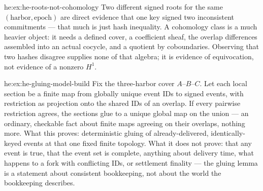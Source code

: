 \begin{pdSolution}{he:ex:he-roots-not-cohomology}
Two different signed roots for the same $(\text{harbor},\text{epoch})$ are
direct evidence that one key signed two inconsistent commitments --- that much
is just hash inequality. A cohomology class is a much heavier object: it needs a
defined cover, a coefficient sheaf, the overlap differences assembled into an
actual cocycle, and a quotient by coboundaries. Observing that two hashes
disagree supplies none of that algebra; it is evidence of equivocation, not
evidence of a nonzero $H^1$.
\end{pdSolution}
\begin{pdSolution}{he:ex:he-gluing-model-build}
Fix the three-harbor cover $A$--$B$--$C$. Let each local section be a
finite map from globally unique event IDs to signed events, with restriction as
projection onto the shared IDs of an overlap. If every pairwise restriction
agrees, the sections glue to a unique global map on the union --- an ordinary,
checkable fact about finite maps agreeing on their overlaps, nothing more. What
this proves: deterministic gluing of already-delivered, identically-keyed events
at that one fixed finite topology. What it does not prove: that any event is
true, that the event set is complete, anything about delivery time, what happens
to a fork with conflicting IDs, or settlement finality --- the gluing lemma is a
statement about consistent bookkeeping, not about the world the bookkeeping
describes.
\end{pdSolution}
